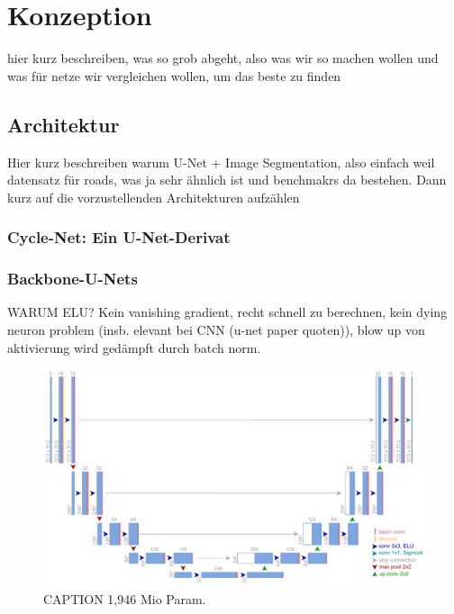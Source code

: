 \chapter{Konzeption} %

hier kurz beschreiben, was so grob abgeht, also was wir so machen wollen und was für netze wir vergleichen wollen,
um das beste zu finden

\section{Architektur}

Hier kurz beschreiben warum U-Net + Image Segmentation, 
also einfach weil datensatz für roads, was ja sehr ähnlich ist und benchmakrs da bestehen.
Dann kurz auf die vorzustellenden Architekturen aufzählen

\subsection{Cycle-Net: Ein U-Net-Derivat}




\subsection{Backbone-U-Nets}


WARUM ELU? 
Kein vanishing gradient, recht schnell zu berechnen, kein dying neuron problem (insb. elevant bei CNN (u-net paper quoten)), blow up von aktivierung wird gedämpft durch batch norm. 

\begin{figure}
	\centering
	\includegraphics[width=1.\textwidth]{Bilder/own-unet-2mil.pdf} 
	\caption{CAPTION 1,946 Mio Param.}
	\label{fig:own-unet-2mil}
\end{figure} 

